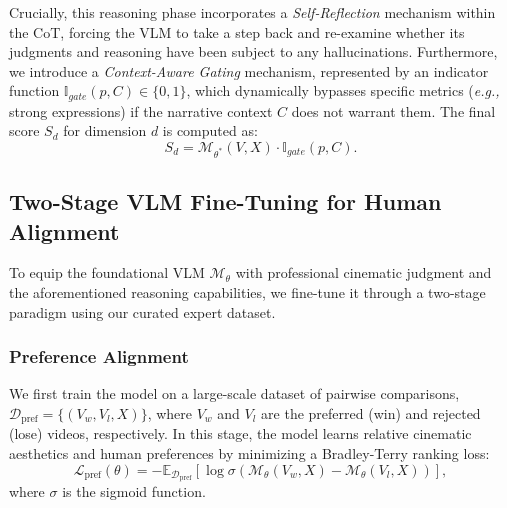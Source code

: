 \documentclass{article}
\begin{document}
Crucially, this reasoning phase incorporates a \textit{Self-Reflection} mechanism within the CoT, forcing the VLM to take a step back and re-examine whether its judgments and reasoning have been subject to any hallucinations. Furthermore, we introduce a \textit{Context-Aware Gating} mechanism, represented by an indicator function $\mathbb{I}_{gate}(p, C) \in \{0, 1\}$, which dynamically bypasses specific metrics (\textit{e.g.,} strong expressions) if the narrative context $C$ does not warrant them. The final score $S_d$ for dimension $d$ is computed as:
\begin{equation}
    S_d = \mathcal{M}_{\theta^*}(V, X) \cdot \mathbb{I}_{gate}(p, C).
\end{equation}

\subsection{Two-Stage VLM Fine-Tuning for Human Alignment}
\label{sec: vlm fine_tuning}
To equip the foundational VLM $\mathcal{M}_{\theta}$ with professional cinematic judgment and the aforementioned reasoning capabilities, we fine-tune it through a two-stage paradigm using our curated expert dataset.

\subsubsection{Preference Alignment}
We first train the model on a large-scale dataset of pairwise comparisons, $\mathcal{D}_{\text{pref}} = \{ (V_{w}, V_{l}, X) \}$, where $V_w$ and $V_l$ are the preferred (win) and rejected (lose) videos, respectively. In this stage, the model learns relative cinematic aesthetics and human preferences by minimizing a Bradley-Terry ranking loss:
\begin{equation}
    \mathcal{L}_{\text{pref}}(\theta) = - \mathbb{E}_{\mathcal{D}_{\text{pref}}} \left[ \log \sigma \left( \mathcal{M}_{\theta}(V_w, X) - \mathcal{M}_{\theta}(V_l, X) \right) \right],
\end{equation}
where $\sigma$ is the sigmoid function.
\end{document}
